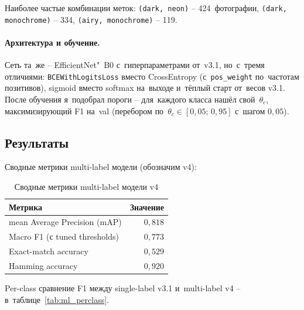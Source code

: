 \documentclass[a4paper,12pt]{diplom}
\begin{document}
Наиболее частые комбинации меток: \texttt{(dark, neon)} -- 424~фотографии, \texttt{(dark, monochrome)} -- 334, \texttt{(airy, monochrome)} -- 119.

\paragraph{Архитектура и обучение.} Сеть та~же -- EfficientNet"~B0 с~гиперпараметрами от~v3.1, но~с~тремя отличиями: \texttt{BCEWithLogitsLoss} вместо CrossEntropy (с~\texttt{pos\_weight} по~частотам позитивов), sigmoid вместо softmax на~выходе и~тёплый старт от~весов v3.1. После обучения я~подобрал пороги -- для~каждого класса нашёл свой~$\theta_c$, максимизирующий F1 на~val (перебором по~$\theta_c \in [0{,}05;\,0{,}95]$ с~шагом $0{,}05$).

\subsection{Результаты}

Сводные метрики multi-label модели (обозначим v4):

\begin{table}[!ht]
\caption{Сводные метрики multi-label модели v4}
\label{tab:multilabel}
\centering
\begin{tabular}{lr}
\toprule
\textbf{Метрика} & \textbf{Значение} \\
\midrule
mean Average Precision (mAP) & $0{,}818$ \\
Macro F1 (с tuned thresholds) & $0{,}773$ \\
Exact-match accuracy        & $0{,}529$ \\
Hamming accuracy             & $0{,}920$ \\
\bottomrule
\end{tabular}
\end{table}

Per-class сравнение F1 между single-label v3.1 и~multi-label v4 -- в~таблице~\ref{tab:ml_perclass}.
\end{document}

